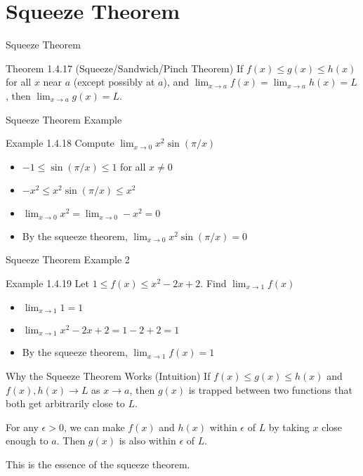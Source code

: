 \documentclass[aspectratio=169]{beamer}
\newcommand{\limx}[2]{\lim_{x \to #1} #2}
\begin{document}
\section{Squeeze Theorem}

\begin{frame}{Squeeze Theorem}
\begin{block}{Theorem 1.4.17 (Squeeze/Sandwich/Pinch Theorem)}
If $f(x) \leq g(x) \leq h(x)$ for all $x$ near $a$ (except possibly at $a$), and $\limx{a}{f(x)} = \limx{a}{h(x)} = L$, then $\limx{a}{g(x)} = L$.
\end{block}
\end{frame}

\begin{frame}{Squeeze Theorem Example}
\begin{block}{Example 1.4.18}
Compute $\limx{0}{x^2 \sin(\pi/x)}$
\end{block}
\begin{itemize}
  \item $-1 \leq \sin(\pi/x) \leq 1$ for all $x \neq 0$
  \item $-x^2 \leq x^2 \sin(\pi/x) \leq x^2$
  \item $\limx{0}{x^2} = \limx{0}{-x^2} = 0$
  \item By the squeeze theorem, $\limx{0}{x^2 \sin(\pi/x)} = 0$
\end{itemize}
\end{frame}

\begin{frame}{Squeeze Theorem Example 2}
\begin{block}{Example 1.4.19}
Let $1 \leq f(x) \leq x^2-2x+2$. Find $\limx{1}{f(x)}$
\end{block}
\begin{itemize}
  \item $\limx{1}{1} = 1$
  \item $\limx{1}{x^2-2x+2} = 1-2+2 = 1$
  \item By the squeeze theorem, $\limx{1}{f(x)} = 1$
\end{itemize}
\end{frame}

\begin{frame}{Why the Squeeze Theorem Works (Intuition)}
If $f(x) \leq g(x) \leq h(x)$ and $f(x), h(x) \to L$ as $x \to a$, then $g(x)$ is trapped between two functions that both get arbitrarily close to $L$.

For any $\epsilon > 0$, we can make $f(x)$ and $h(x)$ within $\epsilon$ of $L$ by taking $x$ close enough to $a$. Then $g(x)$ is also within $\epsilon$ of $L$.

This is the essence of the squeeze theorem.
\end{frame}
\end{document}
